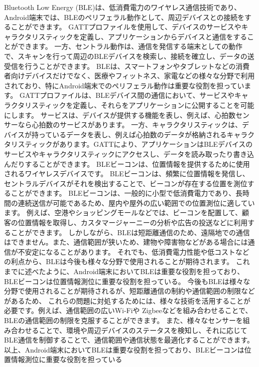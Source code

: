 Bluetooth Low Energy (BLE)は、低消費電力のワイヤレス通信技術であり、Android端末では、BLEのペリフェラル動作として、周辺デバイスとの接続をすることができます。
 GATTプロファイルを使用して、デバイスのサービスやキャラクタリスティックを定義し、アプリケーションからデバイスと通信をすることができます。
 一方、セントラル動作は、通信を発信する端末としての動作で、スキャンを行って周辺のBLEデバイスを検索し、接続を確立し、データの送受信を行うことができます。
BLEは、スマートフォンやタブレットなどの消費者向けデバイスだけでなく、医療やフィットネス、家電などの様々な分野で利用されており、特にAndroid端末でのペリフェラル動作は重要な役割を担っています。
 GATTプロファイルは、BLEデバイス間の通信において、サービスやキャラクタリスティックを定義し、それらをアプリケーションに公開することを可能にします。
 サービスは、デバイスが提供する機能を表し、例えば、心拍数センサーなら心拍数のサービスがあります。
 一方、キャラクタリスティックは、デバイスが持っているデータを表し、例えば心拍数のデータが格納されるキャラクタリスティックがあります。GATTにより、アプリケーションはBLEデバイスのサービスやキャラクタリスティックにアクセスし、データを読み取ったり書き込んだりすることができます。
BLEビーコンは、位置情報を提供するために使用されるワイヤレスデバイスです。
BLEビーコンは、頻繁に位置情報を発信し、セントラルデバイスがそれを検出することで、ビーコンが存在する位置を測位することができます。
BLEビーコンは、一般的に小型で低消費電力であり、長時間の連続送信が可能であるため、屋内や屋外の広い範囲での位置測位に適しています。
例えば、空港やショッピングモールなどでは、ビーコンを配置して、顧客の位置情報を取得し、カスタマージャーニーの分析や広告の投送などに利用することができます。
しかしながら、BLEは短距離通信のため、遠隔地での通信はできません。また、通信範囲が狭いため、建物や障害物などがある場合には通信が不安定になることがあります。
それでも、低消費電力性能や低コストなどの利点から、BLEは今後も様々な分野で使用されることが期待されます。
これまでに述べたように、Android端末においてBLEは重要な役割を担っており、BLEビーコンは位置情報測位に重要な役割を担っている。
今後もBLEは様々な分野で使用されることが期待されるが、短距離通信の制約や通信範囲の制限などがあるため、
これらの問題に対処するためには、様々な技術を活用することが必要です。例えば、通信範囲の広いWi-Fiや Zigbeeなどを組み合わせることで、BLEの通信範囲の制限を克服することができます。
また、様々なセンサーを組み合わせることで、環境や周辺デバイスのステータスを検知し、それに応じてBLE通信を制御することで、通信範囲や通信状態を最適化することができます。
以上、Android端末においてBLEは重要な役割を担っており、BLEビーコンは位置情報測位に重要な役割を担っている
